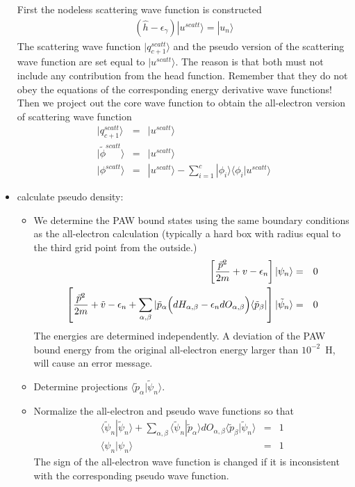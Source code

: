 \documentclass[11pt,a4paper]{report}
\begin{document}
\begin{itemize}
First the nodeless scattering wave function is constructed
\begin{eqnarray*}
(\hat{h}-\epsilon_\gamma)|u^{scatt}\rangle=|u_n\rangle
\end{eqnarray*}
The scattering wave function $|q^{scatt}_{c+1}\rangle$
and the pseudo version of the scattering wave function are set equal
to $|u^{scatt}\rangle$. The reason is that both must not include any
contribution from the head function. Remember that they do not obey
the equations of the corresponding energy derivative wave functions!
Then we project out the core wave function to obtain the all-electron
version of scattering wave function
\begin{eqnarray*}
|q_{c+1}^{scatt}\rangle&=&|u^{scatt}\rangle
\\
|\tilde{\phi}^{scatt}\rangle&=&|u^{scatt}\rangle
\\
|\phi^{scatt}\rangle&=&|u^{scatt}\rangle-\sum_{i=1}^c |\phi_i\rangle\langle\phi_i|u^{scatt}\rangle
\end{eqnarray*}

\item calculate pseudo density: 
\begin{itemize}
\item We determine the PAW bound states
  using the same boundary conditions as the all-electron calculation
  (typically a hard box with radius equal to the third grid point from
  the outside.)
\begin{eqnarray*}
\left[\frac{\vec{p}^2}{2m}+v-\epsilon_n
\right]|\psi_n\rangle&=&0
\\
\left[\frac{\vec{p}^2}{2m}+\tilde{v}-\epsilon_n
+\sum_{\alpha,\beta}|\tilde{p}_\alpha\Bigl(
dH_{\alpha,\beta}-\epsilon_n dO_{\alpha,\beta}\Bigr)
\langle\tilde{p}_\beta|\right]|\tilde\psi_n\rangle&=&0
\end{eqnarray*}
The energies are determined independently. A deviation of the PAW
bound energy from the original all-electron energy larger than
$10^{-2}$~H, will cause an error message.

\item Determine projections $\langle\tilde{p}_\alpha|\tilde\psi_n\rangle$.

\item Normalize the all-electron and pseudo wave functions so that
\begin{eqnarray*}
\langle\tilde{\psi}_n|\tilde{\psi}_n\rangle
+\sum_{\alpha,\beta}\langle\tilde{\psi}_n|\tilde{p}_\alpha\rangle dO_{\alpha,\beta}
\langle\tilde{p}_\beta|\tilde{\psi}_n\rangle &=&1
\\
\langle\psi_n|\psi_n\rangle&=&1
\end{eqnarray*}
The sign of the all-electron wave function is changed if it is
inconsistent with the corresponding pseudo wave function.


\end{itemize}
\end{itemize}
\end{document}
